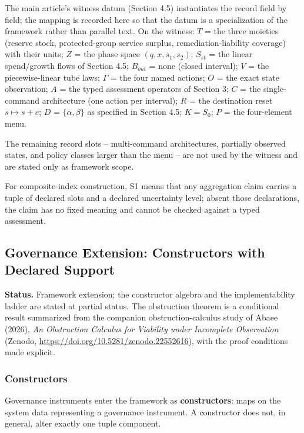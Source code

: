 The main article's witness datum (Section 4.5) instantiates the record field by field; the mapping is recorded here so that the datum is a specialization of the framework rather than parallel text. On the witness: $T$ = the three moieties (reserve stock, protected-group service surplus, remediation-liability coverage) with their units; $Z$ = the phase space $(q, x, s_1, s_2)$; $S_{st}$ = the linear spend/growth flows of Section 4.5; $B_{out}$ = none (closed interval); $V$ = the piecewise-linear tube laws; $\Gamma$ = the four named actions; $O$ = the exact state observation; $A$ = the typed assessment operators of Section 3; $C$ = the single-command architecture (one action per interval); $R$ = the destination reset $s \mapsto s + e$; $D$ = $\{\alpha, \beta\}$ as specified in Section 4.5; $K = S_0$; $P$ = the four-element menu.

The remaining record slots -- multi-command architectures, partially observed states, and policy classes larger than the menu -- are not used by the witness and are stated only as framework scope.

For composite-index construction, S1 means that any aggregation claim carries a tuple of declared slots and a declared uncertainty level; absent those declarations, the claim has no fixed meaning and cannot be checked against a typed assessment.



\subsection{Governance Extension: Constructors with Declared Support}

\textbf{Status.} Framework extension; the constructor algebra and the implementability ladder are stated at partial status. The obstruction theorem is a conditional result summarized from the companion obstruction-calculus study of Abaee (2026), \emph{An Obstruction Calculus for Viability under Incomplete Observation} (Zenodo, \url{https://doi.org/10.5281/zenodo.22552616}), with the proof conditions made explicit.


\subsubsection{Constructors}

Governance instruments enter the framework as \textbf{constructors}: maps on the system data representing a governance instrument. A constructor does not, in general, alter exactly one tuple component.

